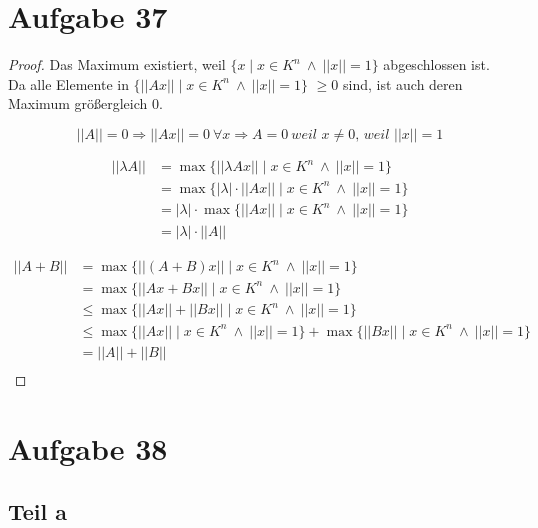 \documentclass[10pt,a4paper]{article}
\begin{document}
\section*{Aufgabe 37}

\begin{proof}
Das Maximum existiert, weil $\{ x \mid x \in K^{n}\ \land\ ||x|| = 1 \}$ abgeschlossen ist.
Da alle Elemente in $\{ ||Ax|| \mid x \in K^{n}\ \land\ ||x|| = 1 \}$ $\ge 0$ sind, ist auch deren Maximum  größergleich $0$.

\begin{equation}
||A|| = 0 \Rightarrow ||Ax|| = 0\ \forall x \Rightarrow A = 0\ \textit{weil $x \ne 0$, weil $||x|| = 1$}
\end{equation}

\begin{align*}
||\lambda A|| & = \max \{ ||\lambda Ax|| \mid x \in K^{n}\ \land\ ||x|| = 1 \}\\
& = \max \{ |\lambda| \cdot ||Ax|| \mid x \in K^{n}\ \land\ ||x|| = 1 \}\\
& = |\lambda| \cdot \max \{ ||Ax|| \mid x \in K^{n}\ \land\ ||x|| = 1 \}\\
& = |\lambda| \cdot ||A||
\end{align*}

\begin{align*}
||A + B|| & = \max \{ ||(A + B)x|| \mid x \in K^{n}\ \land\ ||x|| = 1 \}\\
& = \max \{ ||Ax + Bx|| \mid x \in K^{n}\ \land\ ||x|| = 1 \}\\
& \le \max \{ ||Ax|| + ||Bx|| \mid x \in K^{n}\ \land\ ||x|| = 1 \}\\
& \le \max \{ ||Ax|| \mid x \in K^{n}\ \land\ ||x|| = 1 \} + \max \{ ||Bx|| \mid x \in K^{n}\ \land\ ||x|| = 1 \}\\
& = ||A|| + ||B||\\
\end{align*}
\end{proof}

\section*{Aufgabe 38}

\subsection*{Teil a}
\end{document}
